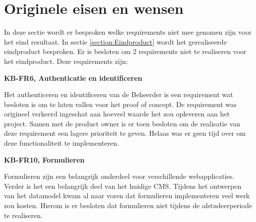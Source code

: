 \section{Originele eisen en wensen}
In deze sectie wordt er besproken welke requirements niet mee genomen zijn voor het eind resultaat.
In sectie \ref{section:Eindproduct} wordt het gerealiseerde eindproduct besproken.
Er is besloten om 2 requirements niet te realiseren voor het eindproduct.
Deze requirements zijn: 

\whitespace
\textbf{KB-FR6, Authenticatie en identificeren}

\whitespace
Het authenticeren en identificeren van de \gls{Beheerder} is een requirement wat besloten is om te laten vallen voor het proof of concept.
De requirement was origineel verkeerd ingeschat aan hoeveel waarde het zou opleveren aan het project.
Samen met de product owner is er toen besloten om de realisatie van deze requirement een lagere prioriteit te geven.
Helaas was er geen tijd over om deze functionaliteit te implementeren.

\whitespace
\textbf{KB-FR10, Formulieren}

\whitespace
Formulieren zijn een belangrijk onderdeel voor verschillende webapplicaties.
Verder is het een belangrijk deel van het huidige \gls{CMS}.
Tijdens het ontwerpen van het datamodel kwam al naar voren dat formulieren implementeren veel werk zou kosten.
Hierom is er besloten dat formulieren niet tijdens de afstudeerperiode te realiseren.

